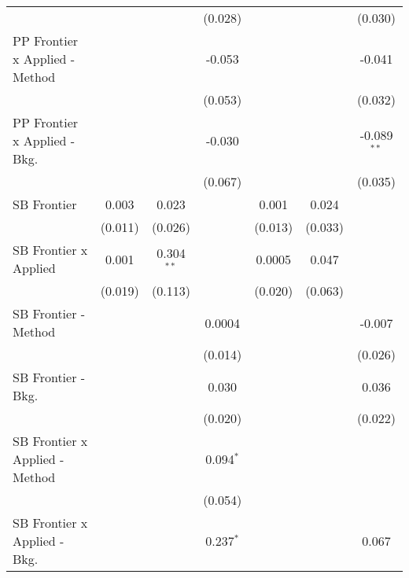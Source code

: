 \begin{tabular}{lcccccc}
                                  &              &              & (0.028)       &              &              & (0.030)\\   
   PP Frontier x Applied - Method &              &              & -0.053        &              &              & -0.041\\   
                                  &              &              & (0.053)       &              &              & (0.032)\\   
   PP Frontier x Applied - Bkg.   &              &              & -0.030        &              &              & -0.089$^{**}$\\   
                                  &              &              & (0.067)       &              &              & (0.035)\\   
   SB Frontier                    & 0.003        & 0.023        &               & 0.001        & 0.024        &   \\   
                                  & (0.011)      & (0.026)      &               & (0.013)      & (0.033)      &   \\   
   SB Frontier x Applied          & 0.001        & 0.304$^{**}$ &               & 0.0005       & 0.047        &   \\   
                                  & (0.019)      & (0.113)      &               & (0.020)      & (0.063)      &   \\   
   SB Frontier - Method           &              &              & 0.0004        &              &              & -0.007\\   
                                  &              &              & (0.014)       &              &              & (0.026)\\   
   SB Frontier - Bkg.             &              &              & 0.030         &              &              & 0.036\\   
                                  &              &              & (0.020)       &              &              & (0.022)\\   
   SB Frontier x Applied - Method &              &              & 0.094$^{*}$   &              &              &   \\   
                                  &              &              & (0.054)       &              &              &   \\   
   SB Frontier x Applied - Bkg.   &              &              & 0.237$^{*}$   &              &              & 0.067\\   

\end{tabular}
